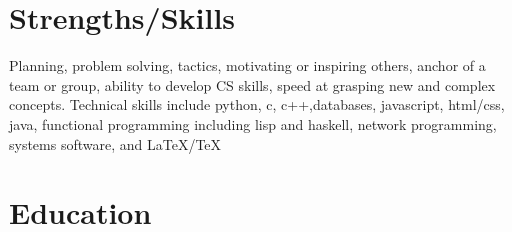 \documentclass[10pt]{article} %
\begin{document}

\section{Strengths/Skills}

{Planning, problem solving, tactics, motivating or inspiring others, anchor of a team or group, ability to develop CS skills, speed at grasping new and complex concepts. Technical skills include python, c, c++,databases, javascript, html/css, java, functional programming including lisp and haskell, network programming, systems software, and \LaTeX/\TeX}


\section{Education}
\end{document}
